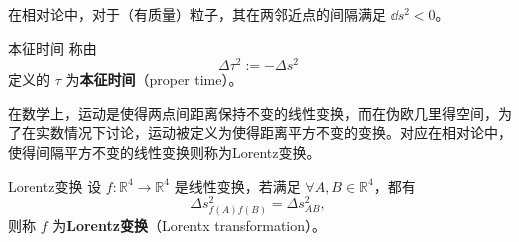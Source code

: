 在相对论中，对于（有质量）粒子，其在两邻近点的间隔满足 $\dd s^2<0$。
\begin{definition}{本征时间}
称由
\begin{equation}
\Delta \tau^2:=-\Delta s^2~
\end{equation}
定义的 $\tau$ 为\textbf{本征时间}（proper time）。
\end{definition}

在数学上，运动是使得两点间距离保持不变的线性变换，而在伪欧几里得空间，为了在实数情况下讨论，运动被定义为使得距离平方不变的变换。对应在相对论中，使得间隔平方不变的线性变换则称为Lorentz变换。
\begin{definition}{Lorentz变换}
设 $f:\mathbb R^4\rightarrow\mathbb R^4$ 是线性变换，若满足 $\forall A,B\in\mathbb R^4$，都有
\begin{equation}
\Delta s^2_{f(A)f(B)}=\Delta s^2_{AB},~
\end{equation}
则称 $f$ 为\textbf{Lorentz变换}（Lorentx transformation）。
\end{definition}




















